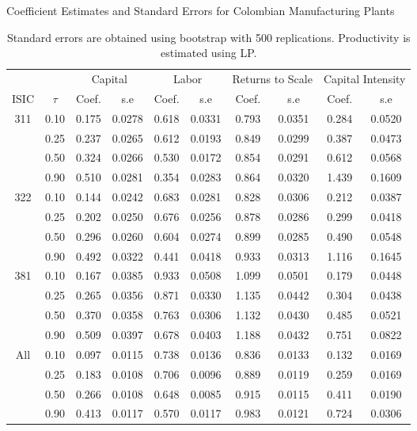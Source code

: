 \documentclass[11pt]{article}
\begin{document}
\begin{table}[H]
\centering
\caption{Coefficient Estimates and Standard Errors for Colombian Manufacturing Plants}
\begin{tabular}{cccccccccc}
  \hline\hline & & \multicolumn{2}{c}{Capital}  & \multicolumn{2}{c}{Labor} & \multicolumn{2}{c}{Returns to Scale} & \multicolumn{2}{c}{Capital Intensity}\\ \cmidrule(lr){3-4} \cmidrule(lr){5-6} \cmidrule(lr){7-8} \cmidrule(lr){9-10}ISIC & $\tau$ & Coef. & s.e & Coef. & s.e & Coef. & s.e & Coef. & s.e \\ 
  \hline
311 & 0.10 & 0.175 & 0.0278 & 0.618 & 0.0331 & 0.793 & 0.0351 & 0.284 & 0.0520 \\ 
   & 0.25 & 0.237 & 0.0265 & 0.612 & 0.0193 & 0.849 & 0.0299 & 0.387 & 0.0473 \\ 
   & 0.50 & 0.324 & 0.0266 & 0.530 & 0.0172 & 0.854 & 0.0291 & 0.612 & 0.0568 \\ 
   & 0.90 & 0.510 & 0.0281 & 0.354 & 0.0283 & 0.864 & 0.0320 & 1.439 & 0.1609 \\ 
  322 & 0.10 & 0.144 & 0.0242 & 0.683 & 0.0281 & 0.828 & 0.0306 & 0.212 & 0.0387 \\ 
   & 0.25 & 0.202 & 0.0250 & 0.676 & 0.0256 & 0.878 & 0.0286 & 0.299 & 0.0418 \\ 
   & 0.50 & 0.296 & 0.0260 & 0.604 & 0.0274 & 0.899 & 0.0285 & 0.490 & 0.0548 \\ 
   & 0.90 & 0.492 & 0.0322 & 0.441 & 0.0418 & 0.933 & 0.0313 & 1.116 & 0.1645 \\ 
  381 & 0.10 & 0.167 & 0.0385 & 0.933 & 0.0508 & 1.099 & 0.0501 & 0.179 & 0.0448 \\ 
   & 0.25 & 0.265 & 0.0356 & 0.871 & 0.0330 & 1.135 & 0.0442 & 0.304 & 0.0438 \\ 
   & 0.50 & 0.370 & 0.0358 & 0.763 & 0.0306 & 1.132 & 0.0430 & 0.485 & 0.0521 \\ 
   & 0.90 & 0.509 & 0.0397 & 0.678 & 0.0403 & 1.188 & 0.0432 & 0.751 & 0.0822 \\ 
  All & 0.10 & 0.097 & 0.0115 & 0.738 & 0.0136 & 0.836 & 0.0133 & 0.132 & 0.0169 \\ 
   & 0.25 & 0.183 & 0.0108 & 0.706 & 0.0096 & 0.889 & 0.0119 & 0.259 & 0.0169 \\ 
   & 0.50 & 0.266 & 0.0108 & 0.648 & 0.0085 & 0.915 & 0.0115 & 0.411 & 0.0190 \\ 
   & 0.90 & 0.413 & 0.0117 & 0.570 & 0.0117 & 0.983 & 0.0121 & 0.724 & 0.0306 \\ 
   \hline
\end{tabular}
\caption*{\footnotesize Standard errors are obtained using bootstrap with 500 replications. Productivity is estimated using LP.}
\label{COLestLP}
\end{table}
\end{document}

